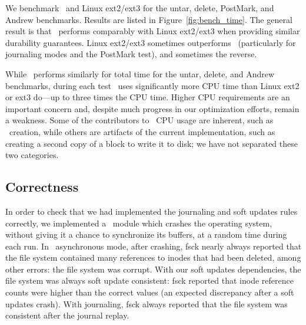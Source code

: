 We benchmark \Kudos\ and Linux ext2/ext3 for the untar, delete,
PostMark, and Andrew benchmarks. Results are listed in
Figure~\ref{fig:bench_time}.
%
The general result is that \Kudos\ performs comparably with Linux
ext2/ext3 when providing similar durability guarantees. Linux
ext2/ext3 sometimes outperforms \Kudos\ (particularly for journaling modes
and the PostMark test), and sometimes the reverse.

\benchtable{}

While \Kudos\ performs similarly for total time for the untar, delete,
and Andrew benchmarks, during each test \Kudos\ uses significantly
more CPU time than Linux ext2 or ext3 do---up to three times the CPU
time.
%
Higher CPU requirements are an important concern and, despite much progress
in our optimization efforts, remain a weakness.
%
Some of the contributors to \Kudos\ CPU usage are inherent, such as
\patch\ creation, while others are artifacts of the current
implementation, such as creating a second copy of a block to write it to
disk; we have not separated these two categories.
%
%
\begin{comment}
Further, while \Kudos\ I/O times are lower than Linux ext2/ext3 I/O
times for the untar and delete benchmarks, we have found that small
block allocation strategy changes can significantly affect I/O time
for many of these benchmarks. This further emphasizes the importance
of the system CPU time difference.
\end{comment}

\begin{comment}
Unlike the untar, delete, and Andrew benchmarks, Linux ext3 writeback
and journal modes outperform \Kudos\ meta journal and full journal
modes, respectively, at PostMark.
\end{comment}


\subsection {Correctness}
\label{sec:eval:correctness}

In order to check that we had implemented the journaling and soft updates
rules correctly,
we implemented a \Kudos\ module which crashes the operating system, without
giving it a chance to synchronize its buffers, at a random time during each
run.
%
In \Kudos\ asynchronous mode, after crashing, fsck nearly always reported
that the file system contained many references to inodes that had been
deleted, among other errors: the file system was corrupt.
%
With our soft updates dependencies, the file system was always soft update
consistent: fsck reported that inode reference counts were higher than the
correct values (an expected discrepancy after a soft updates crash).
%
With journaling, fsck always reported that the file system was
consistent after the journal replay.

